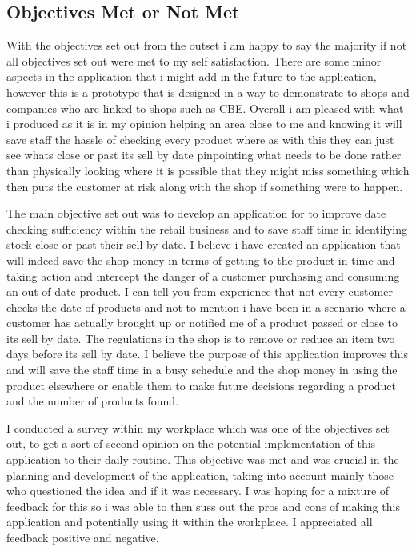 \subsection{Objectives Met or Not Met}
With the objectives set out from the outset i am happy to say the majority if not all objectives set out were met to my self satisfaction. There are some minor aspects in the application that i might add in the future to the application, however this is a prototype that is designed in a way to demonstrate to shops and companies who are linked to shops such as CBE. Overall i am pleased with what i produced as it is in my opinion helping an area close to me and knowing it will save staff the hassle of checking every product where as with this they can just see whats close or past its sell by date pinpointing what needs to be done rather than physically looking where it is possible that they might miss something which then puts the customer at risk along with the shop if something were to happen.
\newline

The main objective set out was to develop an application for to improve date checking sufficiency within the retail business and to save staff time in identifying stock close or past their sell by date. I believe i have created an application that will indeed save the shop money in terms of getting to the product in time and taking action and intercept the danger of a customer purchasing and consuming an out of date product. I can tell you from experience that not every customer checks the date of products and not to mention i have been in a scenario where a customer has actually brought up or notified me of a product passed or close to its sell by date. The regulations in the shop is to remove or reduce an item two days before its sell by date. I believe the purpose of this application improves this and will save the staff time in a busy schedule and the shop money in using the product elsewhere or enable them to make future decisions regarding a product and the number of products found.
\newline

I conducted a survey within my workplace which was one of the objectives set out, to get a sort of second opinion on the potential implementation of this application to their daily routine. This objective was met and was crucial in the planning and development of the application, taking into account mainly those who questioned the idea and if it was necessary. I was hoping for a mixture of feedback for this so i was able to then suss out the pros and cons of making this application and potentially using it within the workplace. I appreciated all feedback positive and negative. 
\newline

